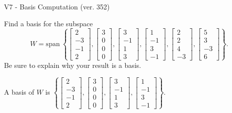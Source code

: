 \begin{exercise}
  \begin{exerciseTitle}V7 - Basis Computation (ver. 352)\end{exerciseTitle}
  \begin{exerciseStatement}
    Find a basis for the subspace 
\[W=\mathrm{span}\ \left\{\left[\begin{array}{r}
2 \\
-3 \\
-1 \\
2
\end{array}\right] , \left[\begin{array}{r}
3 \\
0 \\
0 \\
0
\end{array}\right] , \left[\begin{array}{r}
3 \\
-1 \\
1 \\
3
\end{array}\right] , \left[\begin{array}{r}
1 \\
-1 \\
3 \\
-1
\end{array}\right] , \left[\begin{array}{r}
2 \\
2 \\
4 \\
-3
\end{array}\right] , \left[\begin{array}{r}
5 \\
3 \\
-3 \\
6
\end{array}\right]\right\}.\]
 Be sure to explain why your result is a basis.


  \end{exerciseStatement}
  \begin{exerciseAnswer}
   A basis of \(W\) is  \(\left\{\left[\begin{array}{r}
2 \\
-3 \\
-1 \\
2
\end{array}\right] , \left[\begin{array}{r}
3 \\
0 \\
0 \\
0
\end{array}\right] , \left[\begin{array}{r}
3 \\
-1 \\
1 \\
3
\end{array}\right] , \left[\begin{array}{r}
1 \\
-1 \\
3 \\
-1
\end{array}\right]\right\}\).
  


  \end{exerciseAnswer}
\end{exercise}